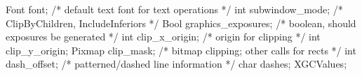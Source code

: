 \documentclass{report}
\begin{document}
\begin{itemize}
\begin{cppcode}
{                Font font;                      /* default text font for text operations */
                int subwindow_mode;             /* ClipByChildren, IncludeInferiors */
                Bool graphics_exposures;        /* boolean, should exposures be generated */
                int clip_x_origin;              /* origin for clipping */
                int clip_y_origin;
                Pixmap clip_mask;               /* bitmap clipping; other calls for rects */
                int dash_offset;                /* patterned/dashed line information */
                char dashes;
            } XGCValues;
            \end{cppcode}



    \end{itemize}

    \pagebreak 
\end{document}
